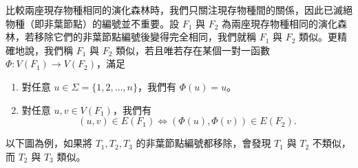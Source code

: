 比較兩座現存物種相同的演化森林時，我們只關注現存物種間的關係，因此已滅絕物種（即非葉節點）的編號並不重要。設
\(F_1\) 與 \(F_2\)
為兩座現存物種相同的演化森林，若移除它們的非葉節點編號後變得完全相同，我們就稱
\(F_1\) 與 \(F_2\) 類似。更精確地說，我們稱 \(F_1\) 與 \(F_2\)
類似，若且唯若存在某個一對一函數 \(\Phi: V(F_1) \to V(F_2)\)，滿足

\begin{enumerate}
\def\labelenumi{\arabic{enumi}.}
\tightlist
\item
  對任意 \(u \in \Sigma = \{1, 2, \ldots, n\}\)，我們有
  \(\Phi(u) = u\)。
\item
  對任意 \(u, v \in V(F_1)\)，我們有
  \[(u, v) \in E(F_1) \iff (\Phi(u), \Phi(v)) \in E(F_2).\]
\end{enumerate}

以下圖為例，如果將 \(T_1, T_2, T_3\) 的非葉節點編號都移除，會發現
\(T_1\) 與 \(T_2\) 不類似，而 \(T_2\) 與 \(T_3\) 類似。

